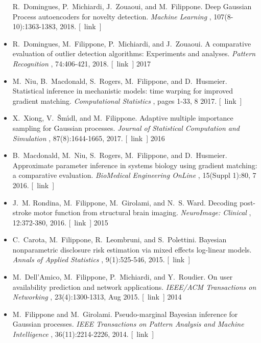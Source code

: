 \documentclass[10pt]{article}
\begin{document}
\begin{itemize}
  R. Domingues, P. Michiardi, J. Zouaoui, and M. Filippone. Deep Gaussian Process autoencoders for novelty detection. \emph{Machine Learning}
, 107(8-10):1363-1383, 2018. [ link ] 

\item 

  R. Domingues, M. Filippone, P. Michiardi, and J. Zouaoui. A comparative evaluation of outlier detection algorithms: Experiments and analyses. \emph{Pattern Recognition}
, 74:406-421, 2018. [ link ] 
2017
\item 

  M. Niu, B. Macdonald, S. Rogers, M. Filippone, and D. Husmeier. Statistical inference in mechanistic models: time warping for improved gradient matching. \emph{Computational Statistics}
, pages 1-33, 8 2017. [ link ] 

\item 

  X. Xiong, V. Šm\'{\i}dl, and M. Filippone. Adaptive multiple importance sampling for Gaussian processes. \emph{Journal of Statistical Computation and Simulation}
, 87(8):1644-1665, 2017. [ link ] 
2016
\item 

  B. Macdonald, M. Niu, S. Rogers, M. Filippone, and D. Husmeier. Approximate parameter inference in systems biology using gradient matching: a comparative evaluation. \emph{BioMedical Engineering OnLine}
, 15(Suppl 1):80, 7 2016. [ link ] 

\item 

  J. M. Rondina, M. Filippone, M. Girolami, and N. S. Ward. Decoding post-stroke motor function from structural brain imaging. \emph{NeuroImage: Clinical}
, 12:372-380, 2016. [ link ] 
2015
\item 

  C. Carota, M. Filippone, R. Leombruni, and S. Polettini. Bayesian nonparametric disclosure risk estimation via mixed effects log-linear models. \emph{Annals of Applied Statistics}
, 9(1):525-546, 2015. [ link ] 

\item 

  M. Dell'Amico, M. Filippone, P. Michiardi, and Y. Roudier. On user availability prediction and network applications. \emph{IEEE/ACM Transactions on Networking}
, 23(4):1300-1313, Aug 2015. [ link ] 
2014
\item 

  M. Filippone and M. Girolami. Pseudo-marginal Bayesian inference for Gaussian processes. \emph{IEEE Transactions on Pattern Analysis and Machine Intelligence}
, 36(11):2214-2226, 2014. [ link ] 


\end{itemize}
\end{document}
